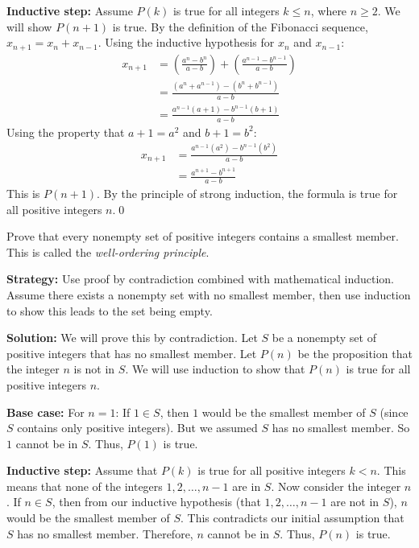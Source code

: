 \textbf{Inductive step:}
Assume $P(k)$ is true for all integers $k \leq n$, where $n \geq 2$. We will show $P(n+1)$ is true.
By the definition of the Fibonacci sequence, $x_{n+1} = x_n + x_{n-1}$.
Using the inductive hypothesis for $x_n$ and $x_{n-1}$:
\begin{align*}
x_{n+1} &= \left( \frac{a^n - b^n}{a-b} \right) + \left( \frac{a^{n-1} - b^{n-1}}{a-b} \right) \\
&= \frac{(a^n + a^{n-1}) - (b^n + b^{n-1})}{a-b} \\
&= \frac{a^{n-1}(a+1) - b^{n-1}(b+1)}{a-b}
\end{align*}
Using the property that $a+1 = a^2$ and $b+1 = b^2$:
\begin{align*}
x_{n+1} &= \frac{a^{n-1}(a^2) - b^{n-1}(b^2)}{a-b} \\
&= \frac{a^{n+1} - b^{n+1}}{a-b}
\end{align*}
This is $P(n+1)$. By the principle of strong induction, the formula is true for all positive integers $n$.\qed



\begin{problembox}
Prove that every nonempty set of positive integers contains a smallest member. This is called the \textit{well-ordering principle}.
\end{problembox}

\noindent\textbf{Strategy:} Use proof by contradiction combined with mathematical induction. Assume there exists a nonempty set with no smallest member, then use induction to show this leads to the set being empty.

\bigskip\noindent\textbf{Solution:}
We will prove this by contradiction.
Let $S$ be a nonempty set of positive integers that has no smallest member.
Let $P(n)$ be the proposition that the integer $n$ is not in $S$. We will use induction to show that $P(n)$ is true for all positive integers $n$.

\textbf{Base case:}
For $n=1$: If $1 \in S$, then $1$ would be the smallest member of $S$ (since $S$ contains only positive integers). But we assumed $S$ has no smallest member. So $1$ cannot be in $S$. Thus, $P(1)$ is true.

\textbf{Inductive step:}
Assume that $P(k)$ is true for all positive integers $k < n$. This means that none of the integers $1, 2, \dots, n-1$ are in $S$.
Now consider the integer $n$. If $n \in S$, then from our inductive hypothesis (that $1, 2, \dots, n-1$ are not in $S$), $n$ would be the smallest member of $S$.
This contradicts our initial assumption that $S$ has no smallest member.
Therefore, $n$ cannot be in $S$. Thus, $P(n)$ is true.

